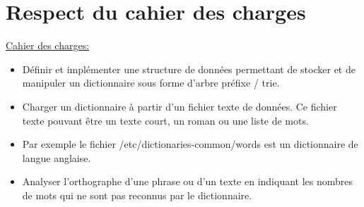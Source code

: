 \documentclass[12pt]{article}
\begin{document}
\newpage
\section{Respect du cahier des charges}

\underline{Cahier des charges:}
\begin{itemize}
\item Définir et implémenter une structure de données permettant de stocker et de manipuler un dictionnaire sous forme d’arbre préfixe / trie.
\item Charger un dictionnaire à partir d’un fichier texte de données. Ce fichier texte pouvant être un texte court, un roman ou une liste de mots.
\item Par exemple le fichier /etc/dictionaries-common/words est un dictionnaire de langue anglaise.
\item Analyser l’orthographe d’une phrase ou d’un texte en indiquant les nombres de mots qui ne sont pas reconnus par le dictionnaire.
\end{itemize}
\newline
\end{document}

